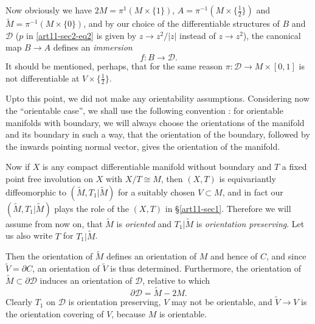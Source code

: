 Now obviously we have $2M=\pi^{1}(M\times \{1\})$, $A=\pi^{-1}(M\times \{\frac{1}{2}\})$ and $\widetilde{M}=\pi^{-1}(M\times \{0\})$, and by our choice of the differentiable structures of $B$ and $\mathscr{D}$ ($p$ in \eqref{art11-sec2-eq2} is given by $z\to z^{2}/|z|$ instead of $z\to z^{2}$), the canonical map $B\to A$ defines an {\em immersion}
$$
f:B\to \mathscr{D}.
$$
It should be mentioned, perhaps, that for the same reason $\pi:\mathscr{D}\to M\times [0,1]$ is not differentiable at $V\times \{\frac{1}{2}\}$.

Up\pageoriginale to this point, we did not make any orientability assumptions. Considering now the ``orientable case'', we shall use the following convention : for orientable manifolds with boundary, we will always choose the orientations of the manifold and its boundary in such a way, that the orientation of the boundary, followed by the inwards pointing normal vector, gives the orientation of the manifold.

Now if $X$ is any compact differentiable manifold without boundary and $T$ a fixed point free involution on $X$ with $X/T\cong M$, then $(X,T)$ is equivariantly diffeomorphic to $(\widetilde{M},T_{1}|\widetilde{M})$ for a suitably chosen $V\subset M$, and in fact our $(\widetilde{M},T_{1}|\widetilde{M})$ plays the role of the $(X,T)$ in \S\ref{art11-sec1}. Therefore we will assume from now on, that $\widetilde{M}$ is {\em oriented} and $T_{1}|\widetilde{M}$ is {\em orientation preserving}. Let us also write $T$ for $T_{1}|\widetilde{M}$.

Then the orientation of $\widetilde{M}$ defines an orientation of $M$ and hence of $C$, and since $\widetilde{V}=\partial C$, an orientation of $\widetilde{V}$ is thus determined. Furthermore, the orientation of $\widetilde{M}\subset\partial \mathscr{D}$ induces an orientation of $\mathscr{D}$, relative to which
\begin{equation*}
\partial \mathscr{D}=\widetilde{M}-2M.\tag{4}\label{art11-sec2-eq4}
\end{equation*}
Clearly $T_{1}$ on $\mathscr{D}$ is orientation preserving, $V$ may not be orientable, and $\widetilde{V}\to V$ is the orientation covering of $V$, because $M$ is orientable.

